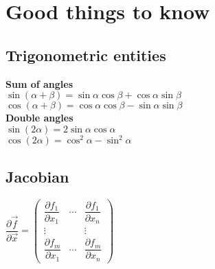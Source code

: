 \section{Good things to know}
\subsection*{Trigonometric entities}
\textbf{Sum of angles}\\
$\sin(\alpha + \beta) = \sin \alpha \cos \beta + \cos \alpha \sin
\beta$\\
$\cos(\alpha + \beta) = \cos \alpha \cos \beta - \sin \alpha \sin
\beta$\\
\textbf{Double angles}\\
$\sin(2 \alpha) = 2 \sin \alpha \cos \alpha$\\
$\cos(2 \alpha) = \cos^2 \alpha - \sin^2 \alpha$

\subsection*{Jacobian}
$ \dfrac{\partial \vec{f}}{\partial{\vec{x}}}
=
\begin{pmatrix}
  \dfrac{\partial {f_1}}{\partial{x_1}} &
  \cdots &
  \dfrac{\partial {f_1}}{\partial{x_n}}\\
  \vdots & & \vdots \\
  \dfrac{\partial {f_m}}{\partial{x_1}} &
  \cdots &
  \dfrac{\partial {f_m}}{\partial{x_n}}
\end{pmatrix}
$\\
